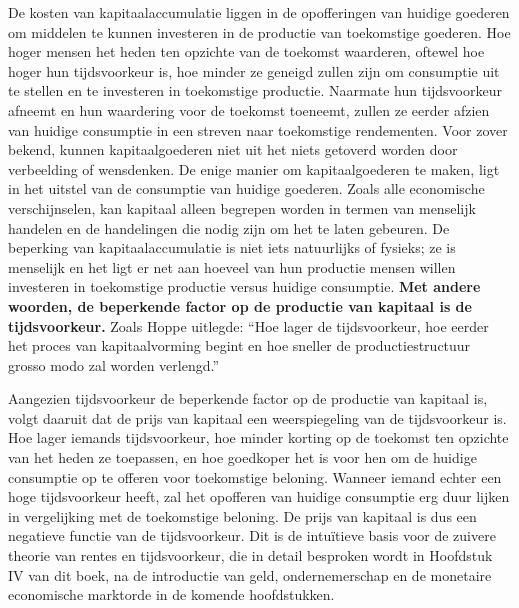De kosten van kapitaalaccumulatie liggen in de opofferingen van huidige goederen om middelen te kunnen investeren in de productie van toekomstige goederen. Hoe hoger mensen het heden ten opzichte van de toekomst waarderen, oftewel hoe hoger hun tijdsvoorkeur is, hoe minder ze geneigd zullen zijn om consumptie uit te stellen en te investeren in toekomstige productie. Naarmate hun tijdsvoorkeur afneemt en hun waardering voor de toekomst toeneemt, zullen ze eerder afzien van huidige consumptie in een streven naar toekomstige rendementen. Voor zover bekend, kunnen kapitaalgoederen niet uit het niets getoverd worden door verbeelding of wensdenken. De enige manier om kapitaalgoederen te maken, ligt in het uitstel van de consumptie van huidige goederen. Zoals alle economische verschijnselen, kan kapitaal alleen begrepen worden in termen van menselijk handelen en de handelingen die nodig zijn om het te laten gebeuren. De beperking van kapitaalaccumulatie is niet iets natuurlijks of fysieks; ze is menselijk en het ligt er net aan hoeveel van hun productie mensen willen investeren in toekomstige productie versus huidige consumptie. \textbf{Met andere woorden, de beperkende factor op de productie van kapitaal is de tijdsvoorkeur.} Zoals Hoppe uitlegde: ``Hoe lager de tijdsvoorkeur, hoe eerder het proces van kapitaalvorming begint en hoe sneller de productiestructuur grosso modo zal worden verlengd.'' \autocite{67}

Aangezien tijdsvoorkeur de beperkende factor op de productie van kapitaal is, volgt daaruit dat de prijs van kapitaal een weerspiegeling van de tijdsvoorkeur is. Hoe lager iemands tijdsvoorkeur, hoe minder korting op de toekomst ten opzichte van het heden ze toepassen, en hoe goedkoper het is voor hen om de huidige consumptie op te offeren voor toekomstige beloning. Wanneer iemand echter een hoge tijdsvoorkeur heeft, zal het opofferen van huidige consumptie erg duur lijken in vergelijking met de toekomstige beloning. De prijs van kapitaal is dus een negatieve functie van de tijdsvoorkeur. Dit is de intuïtieve basis voor de zuivere theorie van rentes en tijdsvoorkeur, die in detail besproken wordt in Hoofdstuk IV van dit boek, na de introductie van geld, ondernemerschap en de monetaire economische marktorde in de komende hoofdstukken.


